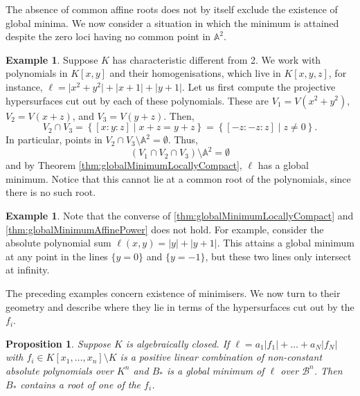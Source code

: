 \documentclass[10pt]{article}
\newtheorem{proposition}[theorem]{Proposition}
\theoremstyle{definition}
\newtheorem{example}[theorem]{Example}
\begin{document}
The absence of common affine roots does not by itself exclude the existence of global minima. We now consider a situation in which the minimum is attained despite the zero loci having no common point in \(\mathbb A^2\).

\begin{example}
    Suppose $K$ has characteristic different from 2.
    We work with polynomials in $K[x, y]$ and their homogenisations, which live in $K[x, y, z]$, for instance, $\ell = \lvert x ^ 2 + y^2 \rvert + \lvert x + 1 \rvert + \lvert y + 1 \rvert$. Let us first compute the projective hypersurfaces cut out by each of these polynomials. These are $V_1 = V(x ^ 2 + y ^ 2)$, $V_2 = V(x + z)$, and $V_3 = V(y + z)$.
    Then,
    $$
    V_2 \cap V_3 = \left\{[x : y : z] \mid x + z = y + z\right\} = \left\{[-z : -z : z] \mid z \ne 0 \right\}.
    $$
    In particular, points in $V_2 \cap V_3 \setminus \mathbb{A}^2 = \emptyset$. Thus,
    $$
    \left( V_1 \cap V_2 \cap V_3 \right) \setminus \mathbb{A}^2 = \emptyset
    $$
    and by Theorem \ref{thm:globalMinimumLocallyCompact}, $\ell$ has a global minimum. Notice that this cannot lie at a common root of the polynomials, since there is no such root.
\end{example}

\begin{example}
    Note that the converse of \cref{thm:globalMinimumLocallyCompact} and \cref{thm:globalMinimumAffinePower} does not hold. For example, consider the absolute polynomial sum
    $
    \ell(x, y) = \lvert y \rvert + \lvert y + 1 \rvert.
    $
    This attains a global minimum at any point in the lines $\{y = 0\}$ and $\{y = -1\}$, but these two lines only intersect at infinity.
\end{example}

The preceding examples concern existence of minimisers. We now turn to their geometry and describe where they lie in terms of the hypersurfaces cut out by the $f_i$. 

\begin{proposition}
  \label{prop:minIsRoot}
  Suppose $K$ is algebraically closed. If $\ell = a_1|f_1| + \dotsc + a_N |f_N|$ with $f_i\in K[x_1,\dots,x_n]\setminus K$ is a positive linear combination of non-constant absolute polynomials over $K^n$ and $B_*$ is a global minimum of $\ell$ over $\mathcal B^n$. Then $B_*$ contains a root of one of the $f_i$. 
\end{proposition}
\end{document}
